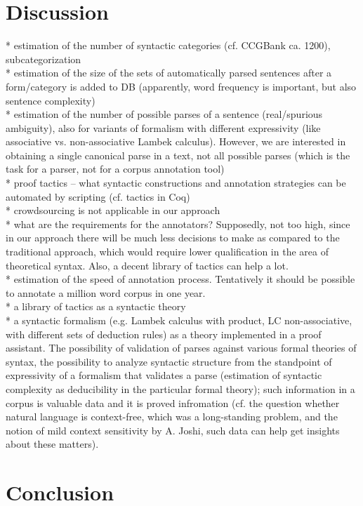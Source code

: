 \documentclass[a4paper]{article}
\theoremstyle{example-style}
\begin{document}
\section{Discussion}

  * estimation of the number of syntactic categories (cf. CCGBank ca. 1200), subcategorization \\
  
  * estimation of the size of the sets of automatically parsed sentences after a form/category is added to DB (apparently, word frequency is important, but also sentence complexity) \\
  
  * estimation of the number of possible parses of a sentence (real/spurious ambiguity), also for variants of formalism with different expressivity (like associative vs. non-associative Lambek calculus). However, we are interested in obtaining a single canonical parse in a text, not all possible parses (which is the task for a parser, not for a corpus annotation tool) \\
  
  * proof tactics -- what syntactic constructions and annotation strategies can be automated by scripting (cf. tactics in Coq) \\
  
  * crowdsourcing is not applicable in our approach \\
  
  * what are the requirements for the annotators? Supposedly, not too high, since in our approach there will be much less decisions  to make as compared to the traditional approach, which would require lower qualification in the area of theoretical syntax. Also, a decent library of tactics can help a lot. \\
  
  * estimation of the speed of annotation process. Tentatively it should be possible to annotate a million word corpus in one year.\\
  
  * a library of tactics as a syntactic theory \\
  
  * a syntactic formalism (e.g. Lambek calculus with product, LC non-associative, with different sets of deduction rules) as a theory implemented in a proof assistant. The possibility of validation of parses against various formal theories of syntax, the possibility to analyze syntactic structure from the standpoint of expressivity of a formalism that validates a parse (estimation of syntactic complexity as deducibility in the particular formal theory); such information in a corpus is valuable data and it is proved infromation (cf. the question whether natural language is context-free, which was a long-standing problem, and the notion of mild context sensitivity by A. Joshi, such data can help get insights about these matters).

\section{Conclusion}

\printbibliography[resetnumbers=true]
\end{document}

